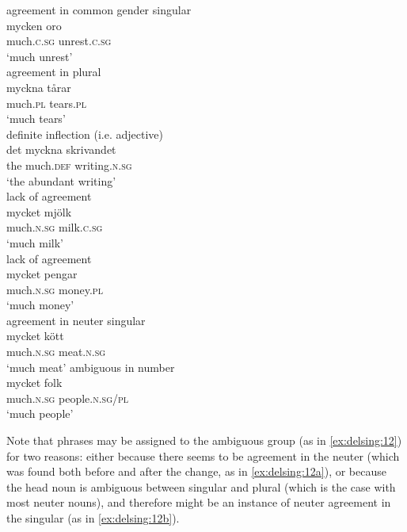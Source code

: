 \documentclass[output=paper]{langscibook}
\begin{document}
\ea\label{ex:delsing:10}
\ea\label{ex:delsing:10a}agreement in common gender singular\\
\gll mycken        oro\\
    much.\textsc{c.sg}      unrest.\textsc{c.sg}                  \\
    \glt ‘much unrest’\\
\ex\label{ex:delsing:10b}agreement in plural\\
\gll myckna      tårar\\
    much.\textsc{pl}  tears.\textsc{pl}                                \\
    \glt ‘much tears’\\
\ex\label{ex:delsing:10c}definite inflection (i.e. adjective)\\
\gll det    myckna       skrivandet\\
    the    much.\textsc{def}   writing.\textsc{n.sg}\\
    \glt ‘the abundant writing’\\
\z
\ex\label{ex:delsing:11}
\ea lack of agreement\\\gll mycket      mjölk\\
    much.\textsc{n.sg}      milk.\textsc{c.sg}\\
    \glt ‘much milk’\\
\ex lack of agreement\\
    \gll mycket            pengar\\
    much.\textsc{n.sg}      money.\textsc{pl} \\
    \glt ‘much money’\\
\z
\ex\label{ex:delsing:12}
\ea\label{ex:delsing:12a}agreement in neuter singular\\
\gll mycket      kött\\
much.\textsc{n.sg}     meat.\textsc{n.sg} \\
    \glt ‘much meat’
\ex \label{ex:delsing:12b}ambiguous in number\\
\gll mycket          folk \\                           
    much.\textsc{n.sg}    people.\textsc{n.sg/pl} \\
    \glt ‘much people’
\z
\z


Note that phrases may be assigned to the ambiguous group (as in \ref{ex:delsing:12}) for two reasons: either because there seems to be agreement in the neuter (which was found both before and after the change, as in \ref{ex:delsing:12a}), or because the head noun is ambiguous between singular and plural (which is the case with most neuter nouns), and therefore might be an instance of neuter agreement in the singular (as in \ref{ex:delsing:12b}).
\end{document}
